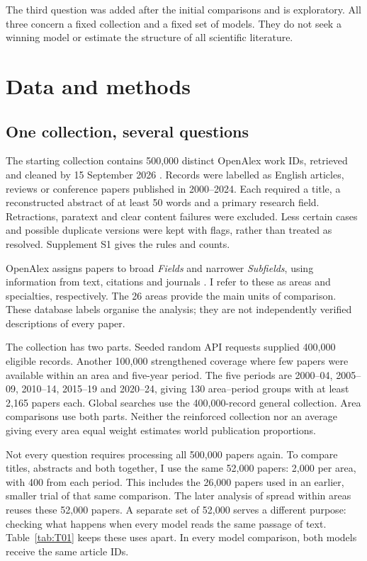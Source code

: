 \documentclass[12pt]{article}
\begin{document}
The third question was added after the initial comparisons and is exploratory. All three concern a fixed collection and a fixed set of models. They do not seek a winning model or estimate the structure of all scientific literature.

\clearpage
\section{Data and methods}
\subsection{One collection, several questions}
The starting collection contains 500,000 distinct OpenAlex work IDs, retrieved and cleaned by 15 September 2026 \citep{priem2022openalex}. Records were labelled as English articles, reviews or conference papers published in 2000--2024. Each required a title, a reconstructed abstract of at least 50 words and a primary research field. Retractions, paratext and clear content failures were excluded. Less certain cases and possible duplicate versions were kept with flags, rather than treated as resolved. Supplement S1 gives the rules and counts.

OpenAlex assigns papers to broad \emph{Fields} and narrower \emph{Subfields}, using information from text, citations and journals \citep{openalex2026topics}. I refer to these as areas and specialties, respectively. The 26 areas provide the main units of comparison. These database labels organise the analysis; they are not independently verified descriptions of every paper.

The collection has two parts. Seeded random API requests supplied 400,000 eligible records. Another 100,000 strengthened coverage where few papers were available within an area and five-year period. The five periods are 2000--04, 2005--09, 2010--14, 2015--19 and 2020--24, giving 130 area--period groups with at least 2,165 papers each. Global searches use the 400,000-record general collection. Area comparisons use both parts. Neither the reinforced collection nor an average giving every area equal weight estimates world publication proportions.

Not every question requires processing all 500,000 papers again. To compare titles, abstracts and both together, I use the same 52,000 papers: 2,000 per area, with 400 from each period. This includes the 26,000 papers used in an earlier, smaller trial of that same comparison. The later analysis of spread within areas reuses these 52,000 papers. A separate set of 52,000 serves a different purpose: checking what happens when every model reads the same passage of text. Table~\ref{tab:T01} keeps these uses apart. In every model comparison, both models receive the same article IDs.

\end{document}
